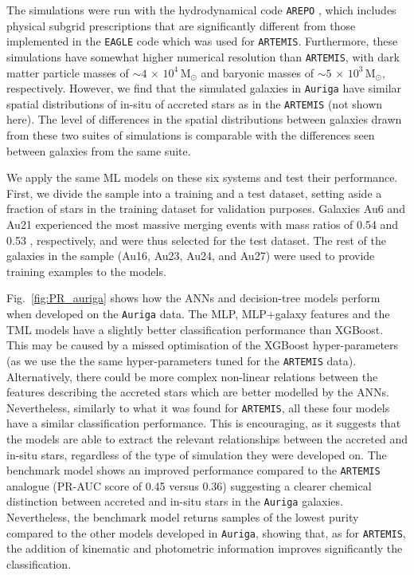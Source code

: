 The simulations were run with the hydrodynamical code \texttt{AREPO} \citep{Springel2010}, which includes physical subgrid prescriptions \citep{Vogelsberger2013} that are significantly different from those implemented in the \texttt{EAGLE} code which was used for \texttt{ARTEMIS}.  Furthermore, these simulations have somewhat higher numerical resolution than \texttt{ARTEMIS}, with dark matter particle masses of $\sim4\,\times\,10^{4}\,\textrm{M}_{\odot}$ and baryonic masses of $\sim5\,\times\,10^{3}\,\textrm{M}_{\odot}$, respectively. However, we find that the simulated galaxies in \texttt{Auriga} have similar spatial distributions of in-situ of accreted stars as in the \texttt{ARTEMIS} (not shown here). The level of differences in the spatial distributions between galaxies drawn from these two suites of simulations is comparable with the differences seen between galaxies from the same suite.

We apply the same ML models on these six systems and test their performance. First, we divide the sample into a training and a test dataset, setting aside a fraction of stars in the training dataset for validation purposes. Galaxies Au6 and Au21 experienced the most massive merging events with mass ratios of 0.54 and 0.53 \citep{Grand2018}, respectively, and were thus selected for the test dataset. The rest of the galaxies in the sample (Au16, Au23, Au24, and Au27) were used to provide training examples to the models.

Fig.~\ref{fig:PR_auriga} shows how the ANNs and decision-tree models perform when developed on the \texttt{Auriga} data. The MLP, MLP+galaxy features and the TML models have a slightly better classification performance than XGBoost. This may be caused by a missed optimisation of the XGBoost hyper-parameters (as we use the the same hyper-parameters tuned for the \texttt{ARTEMIS} data). Alternatively, there could be more complex non-linear relations between the features describing the accreted stars which are better modelled by the ANNs. Nevertheless, similarly to what it was found for \texttt{ARTEMIS}, all these four models have a similar classification performance. This is encouraging, as it suggests that the models are able to extract the relevant relationships between the accreted and in-situ stars, regardless of the type of simulation they were developed on. The benchmark model shows an improved performance compared to the \texttt{ARTEMIS} analogue (PR-AUC score of 0.45 versus 0.36) suggesting a clearer chemical distinction between accreted and in-situ stars in the \texttt{Auriga} galaxies. Nevertheless, the benchmark model returns samples of the lowest purity compared to the other models developed in \texttt{Auriga}, showing that, as for \texttt{ARTEMIS}, the addition of kinematic and photometric information improves significantly the classification.

